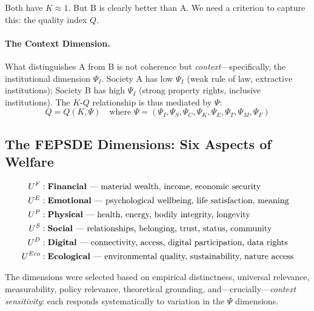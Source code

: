 Both have $K \approx 1$. But B is clearly better than A.
We need a criterion to capture this: the quality index $Q$.

\paragraph{The Context Dimension.}
What distinguishes A from B is not coherence but \emph{context}---specifically,
the institutional dimension $\Psi_I$. Society A has low $\Psi_I$ (weak rule of law,
extractive institutions); Society B has high $\Psi_I$ (strong property rights,
inclusive institutions). The $K$-$Q$ relationship is thus mediated by $\Psi$:
\begin{equation}
  Q = Q(K, \Psi) \quad \text{where } \Psi = (\Psi_I, \Psi_S, \Psi_C, \Psi_K, \Psi_E, \Psi_T, \Psi_M, \Psi_F)
  \label{eq:Q-K-Psi}
\end{equation}

\subsection{The FEPSDE Dimensions: Six Aspects of Welfare}

\begin{definition}
\label{def:fepsde}
\begin{align*}
  U^F &: \text{\textbf{Financial} --- material wealth, income, economic security} \\
  U^E &: \text{\textbf{Emotional} --- psychological wellbeing, life satisfaction, meaning} \\
  U^P &: \text{\textbf{Physical} --- health, energy, bodily integrity, longevity} \\
  U^S &: \text{\textbf{Social} --- relationships, belonging, trust, status, community} \\
  U^D &: \text{\textbf{Digital} --- connectivity, access, digital participation, data rights} \\
  U^{Eco} &: \text{\textbf{Ecological} --- environmental quality, sustainability, nature access}
\end{align*}
\end{definition}

The dimensions were selected based on empirical distinctness, universal relevance,
measurability, policy relevance, theoretical grounding, and---crucially---\emph{context sensitivity}:
each responds systematically to variation in the $\Psi$ dimensions.

